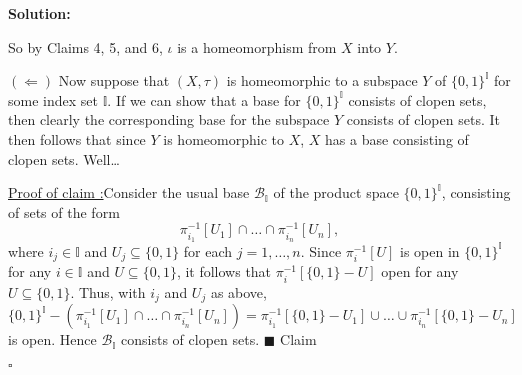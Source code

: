 \documentclass[12pt]{article}
\newcounter{ProofCounter}
\newcounter{ClaimCounter}[ProofCounter]
\newenvironment{Solution}{\stepcounter{ProofCounter}\textbf{Solution:}}{\hfill$\square$}
\newenvironment{claim}[1]{\vspace{1mm}\stepcounter{ClaimCounter}\par\noindent\underline{\bf Claim \theClaimCounter:}\space#1}{}
\newenvironment{claimproof}[1]{\par\noindent\underline{Proof of claim \theClaimCounter:}\space#1}{\hfill $\blacksquare$ Claim \theClaimCounter}
\begin{document}
\begin{Solution}
\begin{enumerate}
      So by Claims 4, 5, and 6, $\iota$ is a homeomorphism from $X$ into $Y$.

      $(\Leftarrow)$ Now suppose that $(X, \tau)$ is homeomorphic to a subspace $Y$ of $\{0, 1\}^{\mathbb{I}}$ for some index set $\mathbb{I}$.
      If we can show that a base for $\{0,1\}^{\mathbb{I}}$ consists of clopen sets, then clearly the corresponding base for the subspace $Y$ consists 
      of clopen sets. It then follows that since $Y$ is homeomorphic to $X$, $X$ has a base consisting of clopen sets. Well\dots

      \begin{claimproof}
        Consider the usual base $\mathcal{B}_{\mathbb{I}}$ of the product space $\{0,1\}^{\mathbb{I}}$, consisting of sets of the form
        \[
          \pi_{i_1}^{-1}[U_1] \cap \dots \cap \pi_{i_n}^{-1}[U_n],
        \]
        where $i_j \in \mathbb{I}$ and $U_j \subseteq \{0,1\}$ for each $j = 1, \dots, n$. Since $\pi_{i}^{-1}[U]$ is open in $\{0,1\}^{\mathbb{I}}$ 
        for any $i \in \mathbb{I}$ and $U \subseteq \{0,1\}$, it follows that $\pi_{i}^{-1}[\{0,1\}-U]$ open for any $U \subseteq \{0,1\}$.
        Thus, with $i_j$ and $U_j$ as above,
        \[
          \{0,1\}^{\mathbb{I}} - \left(\pi_{i_1}^{-1}[U_1] \cap \dots \cap \pi_{i_n}^{-1}[U_n]\right) = \pi_{i_1}^{-1}[\{0,1\}-U_1] \cup \dots \cup
          \pi_{i_n}^{-1}[\{0,1\} - U_n]
        \]
        is open. Hence $\mathcal{B}_{\mathbb{I}}$ consists of clopen sets.
      \end{claimproof}
  \end{enumerate}
\end{Solution}
\end{document}

